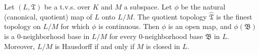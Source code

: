 Let $(L, \mathfrak{T})$ be a t.v.s. over $K$ and $M$ a subspace. Let $\phi$ be the natural (canonical, quotient) map of $L$ onto $L/M$. The quotient topology $\hat{\mathfrak{T}}$ is the finest topology on $L/M$ for which $\phi$ is continuous. Then $\phi$ is an open map, and $\phi(\mathfrak{B})$ is a 0-neighborhood base in $L/M$ for every 0-neighborhood base $\mathfrak{B}$ in $L$. Moreover, $L/M$ is Hausdorff if and only if $M$ is closed in $L$.
